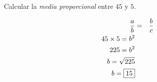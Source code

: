 \item{Calcular la \textit{media proporcional} entre $45$ y $5$.
	\begin{tasks}
	\end{tasks}
	\begin{eqnarray*}
		\dfrac{a}{b} &=& \dfrac{b}{c} \\
		45 \times 5 = b^2 \\
		225 = b^2 \\
		b = \sqrt{225} \\
		b = \fbox{15}
	\end{eqnarray*}
}